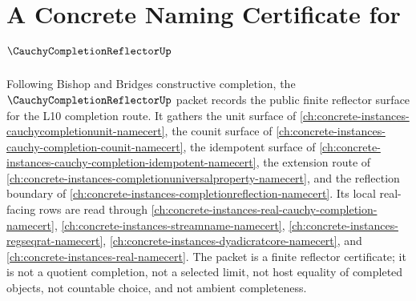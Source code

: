 \chapter{A Concrete Naming Certificate for $\CauchyCompletionReflectorUp$}
\label{ch:concrete-instances-cauchycompletionreflector-namecert}

Following Bishop and Bridges constructive completion, the $\CauchyCompletionReflectorUp$ packet records the public finite reflector surface for the L10 completion route. It gathers the unit surface of \autoref{ch:concrete-instances-cauchycompletionunit-namecert}, the counit surface of \autoref{ch:concrete-instances-cauchy-completion-counit-namecert}, the idempotent surface of \autoref{ch:concrete-instances-cauchy-completion-idempotent-namecert}, the extension route of \autoref{ch:concrete-instances-completionuniversalproperty-namecert}, and the reflection boundary of \autoref{ch:concrete-instances-completionreflection-namecert}. Its local real-facing rows are read through \autoref{ch:concrete-instances-real-cauchy-completion-namecert}, \autoref{ch:concrete-instances-streamname-namecert}, \autoref{ch:concrete-instances-regseqrat-namecert}, \autoref{ch:concrete-instances-dyadicratcore-namecert}, and \autoref{ch:concrete-instances-real-namecert}. The packet is a finite reflector certificate; it is not a quotient completion, not a selected limit, not host equality of completed objects, not countable choice, and not ambient completeness.

